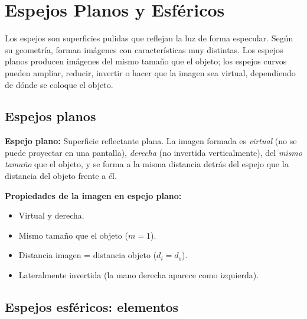 
\section{Espejos Planos y Esféricos}

\begin{seccion}
Los espejos son superficies pulidas que reflejan la luz de forma especular. Según su geometría, forman imágenes con características muy distintas. Los espejos planos producen imágenes del mismo tamaño que el objeto; los espejos curvos pueden ampliar, reducir, invertir o hacer que la imagen sea virtual, dependiendo de dónde se coloque el objeto.
\end{seccion}

\subsection{Espejos planos}

\begin{seccion}
\begin{definicion}
\textbf{Espejo plano:} Superficie reflectante plana. La imagen formada es \textit{virtual} (no se puede proyectar en una pantalla), \textit{derecha} (no invertida verticalmente), del \textit{mismo tamaño} que el objeto, y se forma a la misma distancia detrás del espejo que la distancia del objeto frente a él.
\end{definicion}

\textbf{Propiedades de la imagen en espejo plano:}
\begin{itemize}
    \item Virtual y derecha.
    \item Mismo tamaño que el objeto ($m = 1$).
    \item Distancia imagen = distancia objeto ($d_i = d_o$).
    \item Lateralmente invertida (la mano derecha aparece como izquierda).
\end{itemize}
\end{seccion}

\subsection{Espejos esféricos: elementos}

